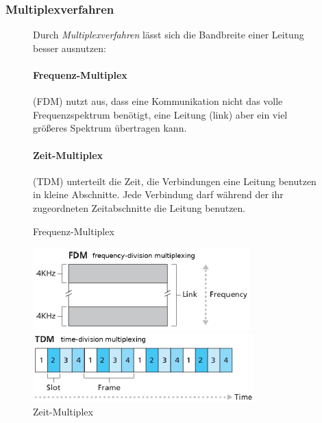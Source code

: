 \documentclass[12pt]{report}
\begin{document}
\subsubsection{Multiplexverfahren}
\begin{figure}[H]
  \begin{minipage}[t]{0.45\textwidth}
    Durch \textit{Multiplexverfahren} lässt sich die Bandbreite einer Leitung besser ausnutzen:

    \paragraph{Frequenz-Multiplex} (FDM) nutzt aus, dass eine Kommunikation nicht das volle Frequenzspektrum benötigt, 
    eine Leitung (link) aber ein viel größeres Spektrum übertragen kann.

    \paragraph{Zeit-Multiplex} (TDM) unterteilt die Zeit, die Verbindungen eine Leitung benutzen in kleine Abschnitte. 
    Jede Verbindung darf während der ihr zugeordneten Zeitabschnitte die Leitung benutzen.

  \end{minipage}
  \hfill
  \begin{minipage}[t]{0.45\textwidth}
    \caption{Frequenz-Multiplex}
    \label{fig:frequenz-multiplex}
    \begin{center}
      \includegraphics{frequenz-multiplex}
    \end{center}


    \caption{Zeit-Multiplex}
    \label{fig:zeit-multiplex}
    \begin{center}
      \includegraphics{zeit-multiplex}
    \end{center}
  \end{minipage}
\end{figure}
\end{document}
